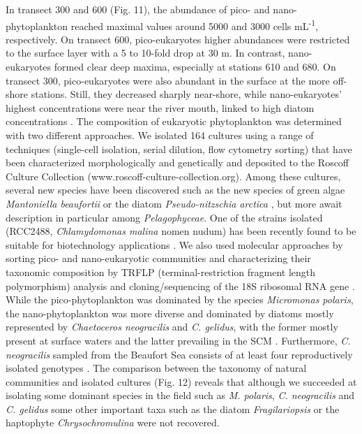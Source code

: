 \documentclass[essd, manuscript]{copernicus}
\begin{document}
In transect 300 and 600 (Fig. 11), the abundance of pico- and nano-phytoplankton reached maximal values around 5000 and 3000 cells mL\textsuperscript{-1}, respectively.  On transect 600, pico-eukaryotes higher abundances were restricted to the surface layer with a 5 to 10-fold drop at 30 m.  In contrast, nano-eukaryotes formed clear deep maxima, especially at stations 610 and 680.  On transect 300, pico-eukaryotes were also abundant in the surface at the more off-shore stations. Still, they decreased sharply near-shore, while nano-eukaryotes' highest concentrations were near the river mouth, linked to high diatom concentrations \citep{Balzano2012}.  The composition of eukaryotic phytoplankton was determined with two different approaches.  We isolated 164 cultures using a range of techniques (single-cell isolation, serial dilution, flow cytometry sorting) that have been characterized morphologically and genetically \citep{Balzano2012, Balzano2017} and deposited to the Roscoff Culture Collection (www.roscoff-culture-collection.org).  Among these cultures, several new species have been discovered such as the new species of green algae \textit{Mantoniella beaufortii} \citep{Yau2020} or the diatom \textit{Pseudo-nitzschia arctica} \citep{Percopo2016}, but more await description in particular among \textit{Pelagophyceae}.  One of the strains isolated (RCC2488, \textit{Chlamydomonas malina} nomen nudum) has been recently found to be suitable for biotechnology applications \citep{Morales-Sanchez2020}. We also used molecular approaches by sorting pico- and nano-eukaryotic communities and characterizing their taxonomic composition by TRFLP (terminal-restriction fragment length polymorphism) analysis and cloning/sequencing of the 18S ribosomal RNA gene \citep{Balzano2012}.  While the pico-phytoplankton was dominated by the species \textit{Micromonas polaris}, the nano-phytoplankton was more diverse and dominated by diatoms mostly represented by \textit{Chaetoceros neogracilis} and \textit{C. gelidus}, with the former mostly present at surface waters and the latter prevailing in the SCM \citep{Balzano2012}. Furthermore, \textit{C. neogracilis} sampled from the Beaufort Sea consists of at least four reproductively isolated genotypes \citep{Balzano2017}.  The comparison between the taxonomy of natural communities and isolated cultures (Fig. 12) reveals that although we succeeded at isolating some dominant species in the field such as \textit{M. polaris}, \textit{C. neogracilis} and \textit{C. gelidus} some other important taxa such as the diatom \textit{Fragilariopsis} or the haptophyte \textit{Chrysochromulina} were not recovered.
\end{document}
